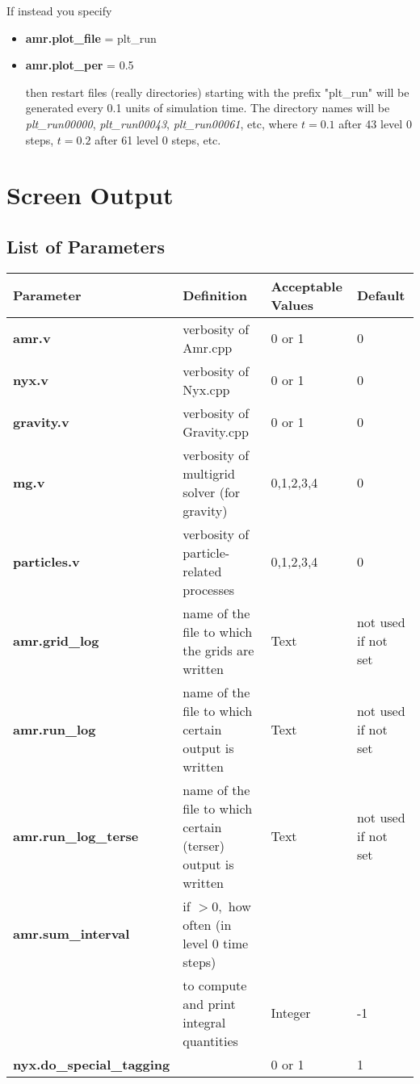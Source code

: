 If instead you specify

\begin{itemize}

\item {\bf amr.plot\_file} = plt\_run
\item {\bf amr.plot\_per} = 0.5

then restart files (really directories) starting with the prefix "plt\_run" will be
generated every 0.1 units of simulation time.  The directory names will be {\it plt\_run00000}, 
{\it plt\_run00043}, {\it plt\_run00061}, etc, where $t = 0.1$ after 43 level 0 steps, 
$t = 0.2$ after 61 level 0 steps, etc.

\end{itemize}

\section{Screen Output}

\subsection{List of Parameters}

\begin{table*}[h]
\begin{scriptsize}
\begin{center}
\begin{tabular}{|l|l|l|l|} \hline
Parameter & Definition & Acceptable Values &Default\\
\hline
{\bf amr.v} & verbosity of Amr.cpp & 0 or 1 & 0 \\
{\bf nyx.v} & verbosity of Nyx.cpp & 0 or 1 & 0 \\
{\bf gravity.v} & verbosity of Gravity.cpp & 0 or 1 & 0 \\
{\bf mg.v} & verbosity of multigrid solver (for gravity) & 0,1,2,3,4 & 0 \\
{\bf particles.v} & verbosity of particle-related processes & 0,1,2,3,4 & 0 \\
{\bf amr.grid\_log}       & name of the file to which the grids are written & Text & not used if not set \\
{\bf amr.run\_log}        & name of the file to which certain output is written & Text & not used if not set \\
{\bf amr.run\_log\_terse} & name of the file to which certain (terser) output is written & Text & not used if not set \\
{\bf amr.sum\_interval}   & if $> 0,$ how often (in level 0 time steps) & &  \\  
                          & to compute and print integral quantities & Integer & -1 \\  
{\bf nyx.do\_special\_tagging} & & 0 or 1 & 1 \\
\hline
\end{tabular}
\end{center}
\end{scriptsize}
\end{table*}

